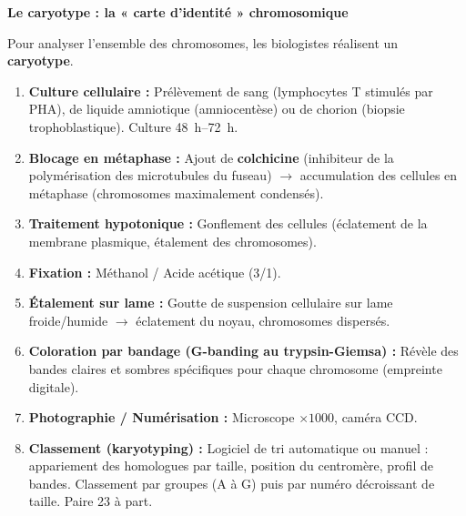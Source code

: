 \documentclass[11pt]{article}
\begin{document}
\textbf{Le caryotype : la « carte d'identité » chromosomique}\par

Pour analyser l'ensemble des chromosomes, les biologistes réalisent un \textbf{caryotype}.

\begin{methode}
\begin{enumerate}
    \item \textbf{Culture cellulaire :} Prélèvement de sang (lymphocytes T stimulés par PHA), de liquide amniotique (amniocentèse) ou de chorion (biopsie trophoblastique). Culture \SIrange{48}{72}{h}.
    \item \textbf{Blocage en métaphase :} Ajout de \textbf{colchicine} (inhibiteur de la polymérisation des microtubules du fuseau) $\rightarrow$ accumulation des cellules en métaphase (chromosomes maximalement condensés).
    \item \textbf{Traitement hypotonique :} Gonflement des cellules (éclatement de la membrane plasmique, étalement des chromosomes).
    \item \textbf{Fixation :} Méthanol / Acide acétique (3/1).
    \item \textbf{Étalement sur lame :} Goutte de suspension cellulaire sur lame froide/humide $\rightarrow$ éclatement du noyau, chromosomes dispersés.
    \item \textbf{Coloration par bandage (G-banding au trypsin-Giemsa) :} Révèle des bandes claires et sombres spécifiques pour chaque chromosome (empreinte digitale).
    \item \textbf{Photographie / Numérisation :} Microscope $\times 1000$, caméra CCD.
    \item \textbf{Classement (karyotyping) :} Logiciel de tri automatique ou manuel : appariement des homologues par taille, position du centromère, profil de bandes. Classement par groupes (A à G) puis par numéro décroissant de taille. Paire 23 à part.
\end{enumerate}
\end{methode}
\end{document}
